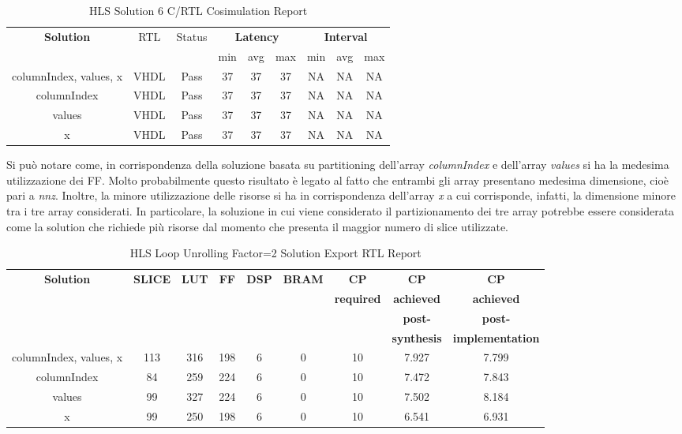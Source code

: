 \begin{table}[H]
	\centering
	\begin{tabular}{|c|c|c|c|c|c|c|c|c|}
		\hline
		\multicolumn{1}{|c|}{\textbf{Solution}} & \multicolumn{1}{|c|}{RTL} & \multicolumn{1}{|c|}{Status} & \multicolumn{3}{c|}{\textbf{Latency}} & \multicolumn{3}{c|}{\textbf{Interval}} \\
		& &  & min & avg & max & min & avg & max \\
		\hline
		columnIndex, values, x & VHDL & Pass & 37 & 37 & 37 & NA & NA & NA \\
		\hline
		columnIndex & VHDL & Pass & 37 & 37 & 37 & NA & NA & NA \\
		\hline
		values & VHDL & Pass & 37 & 37 & 37 & NA & NA & NA \\
		\hline
		x & VHDL & Pass & 37 & 37 & 37 & NA & NA & NA \\
		\hline
	\end{tabular}
	\caption{HLS Solution 6 C/RTL Cosimulation Report }
	\label{tab:hls-solution-6-cosimulation-report}
\end{table}

Si può notare come, in corrispondenza della soluzione basata su partitioning dell'array \textit{columnIndex} e dell'array \textit{values} si ha la medesima utilizzazione dei FF. Molto probabilmente questo risultato è legato al fatto che entrambi gli array presentano medesima dimensione, cioè pari a \textit{nnz}. Inoltre, la minore utilizzazione delle risorse si ha in corrispondenza dell'array \textit{x} a cui corrisponde, infatti, la dimensione minore tra i tre array considerati. In particolare, la soluzione in cui viene considerato il partizionamento dei tre array potrebbe essere considerata come la solution che richiede più risorse dal momento che presenta il maggior numero di slice utilizzate.

\begin{table}[H]
	\centering
	\begin{tabular}{|c|c|c|c|c|c|c|c|c|}
		\hline
		\textbf{Solution} & \textbf{SLICE} & \textbf{LUT} & \textbf{FF} & \textbf{DSP} & \textbf{BRAM} & \textbf{CP} & \textbf{CP} & \textbf{CP} \\
		& & & & & & \textbf{required} & \textbf{achieved} & \textbf{achieved}\\
		& & & & & & & \textbf{post-} & \textbf{post-}\\
		& & & & & & & \textbf{synthesis} & \textbf{implementation}\\
		\hline
		columnIndex, values, x  & 113 & 316 & 198 & 6 & 0 & 10 & 7.927 & 7.799 \\
		\hline
		columnIndex  & 84 & 259 & 224 & 6 & 0 & 10 & 7.472 & 7.843 \\
		\hline
		values  & 99 & 327 & 224 & 6 & 0 & 10 & 7.502 & 8.184 \\
		\hline
		x  & 99 & 250 & 198 & 6 & 0 & 10 & 6.541 & 6.931 \\
		\hline
	\end{tabular}
	\caption{HLS Loop Unrolling Factor=2 Solution Export RTL Report}
	\label{tab:hls-solution-6-export-rtl-report}
\end{table}